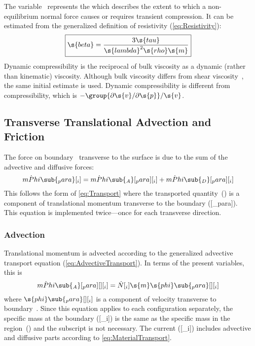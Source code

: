 The variable~ represents the \emph{} which describes the extent to which a non-equilibrium normal force causes or requires transient compression.  It can be estimated from the generalized definition of resistivity (\autoref{eq:Resistivity}):
\begin{equation}
  \label{eq:DynamicCompressibility}
  \boxed{\s{beta} = \frac{3\s{tau}}{\s{lambda}^2\s{rho}\s{m}}}
\end{equation}
Dynamic compressibility is the reciprocal of bulk viscosity as a dynamic (rather than kinematic) viscosity.  Although bulk viscosity differs from shear viscosity~\cite{Karim1952, Schetz1996, Rah1999, Liggett1994}, %
the same initial estimate is used.  Dynamic compressibility is different from compressibility, which is $-\group{\partial\s{v}/\partial\s{p}}/\s{v}$.


\subsection{Transverse Translational Advection and Friction}
\label{sec:TransverseTransport}

The force on boundary~ transverse to the surface is due to the sum of the advective and diffusive forces:
\begin{equation}
  \label{eq:TransverseForce}
  \dot{mPhi}\sub{_para}[_i] = \dot{mPhi}\sub{_A}[_para][_i] + \dot{mPhi}\sub{_D}[_para][_i]
\end{equation}
This follows the form of \autoref{eq:Transport} where the transported quantity~() is a component of translational momentum transverse to the boundary ([_para]).  This equation is implemented twice---once for each transverse direction.


\subsubsection{Advection}

Translational momentum is advected according to the generalized advective transport equation (\ref{eq:AdvectiveTransport}).  In terms of the present variables, this is
\begin{equation}
  \label{eq:TransverseAdvection}
  \dot{mPhi}\sub{_A}[_para][ ][_i] = \dot{N}[_i]\s{m}\s{phi}\sub{_para}[ ][_i]
\end{equation}
where $\s{phi}\sub{_para}[ ][_i]$ is a component of velocity transverse to boundary~.  Since this equation applies to each configuration separately, the specific mass at the boundary ([_i]) is the same as the specific mass in the region~() and the subscript is not necessary.  The current ([_i]) includes advective and diffusive parts according to \autoref{eq:MaterialTransport}.


